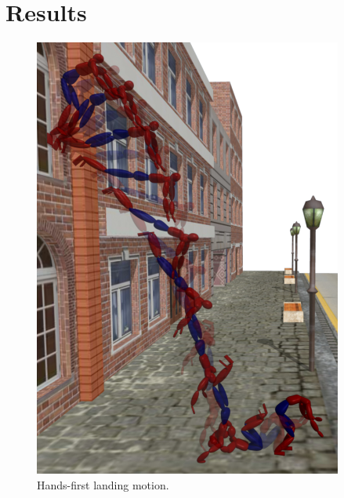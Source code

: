 \section{Results}

\begin{figure}[ht]
\center
  \includegraphics[width=4.0in]{images/ResultImageCol}
  \caption{Hands-first landing motion.}
  \label{fig:landing_resultHands}
\end{figure}


